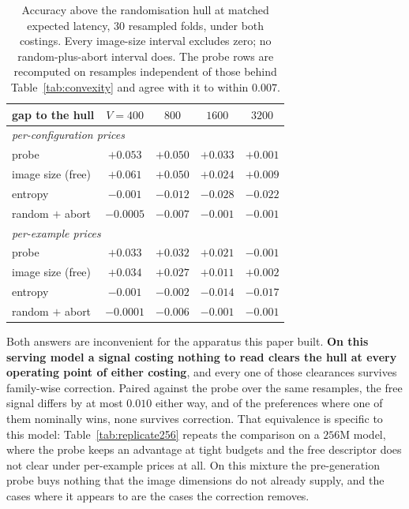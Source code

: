 \documentclass[10pt,twocolumn]{article}
\theoremstyle{plain}
\begin{document}
\begin{table}[t]
\centering\small
\setlength{\tabcolsep}{3.5pt}
\begin{tabular}{lcccc}
\toprule
gap to the hull & $V{=}400$ & $800$ & $1600$ & $3200$ \\
\midrule
\multicolumn{5}{l}{\emph{per-configuration prices}} \\
probe & $+0.053$ & $+0.050$ & $+0.033$ & $+0.001$ \\
image size (free) & $\mathbf{+0.061}$ & $+0.050$ & $+0.024$ & $+0.009$ \\
entropy & $-0.001$ & $-0.012$ & $-0.028$ & $-0.022$ \\
random $+$ abort & $-0.0005$ & $-0.007$ & $-0.001$ & $-0.001$ \\
\midrule
\multicolumn{5}{l}{\emph{per-example prices}} \\
probe & $+0.033$ & $+0.032$ & $+0.021$ & $-0.001$ \\
image size (free) & $\mathbf{+0.034}$ & $+0.027$ & $+0.011$ & $+0.002$ \\
entropy & $-0.001$ & $-0.002$ & $-0.014$ & $-0.017$ \\
random $+$ abort & $-0.0001$ & $-0.006$ & $-0.001$ & $-0.001$ \\
\bottomrule
\end{tabular}
\caption{Accuracy above the randomisation hull at matched expected latency,
$30$ resampled folds, under both costings. Every image-size interval excludes
zero; no random-plus-abort interval does. The probe rows are recomputed on
resamples independent of those behind Table~\ref{tab:convexity} and agree with
it to within $0.007$.}
\label{tab:freesignal}
\end{table}

Both answers are inconvenient for the apparatus this paper built. \textbf{On
this serving model a signal costing nothing to read clears the hull at every
operating point of either costing}, and every one of those clearances survives
family-wise correction. Paired against the probe over the same resamples, the
free signal differs by at most $0.010$ either way, and of the preferences where
one of them nominally wins, none survives correction. That equivalence is
specific to this model: Table~\ref{tab:replicate256} repeats the comparison on
a $256$M model, where the probe keeps an advantage at tight budgets and the
free descriptor does not clear under per-example prices at all. On this mixture the pre-generation probe
buys nothing that the image dimensions do not already supply, and the cases
where it appears to are the cases the correction removes.
\end{document}
